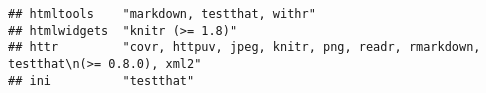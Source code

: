 \documentclass[]{book}
\begin{document}
\begin{verbatim}
## htmltools    "markdown, testthat, withr"                                                                                                                                                                                                                                                                                                                                                                                                                                                                                                                                                                                                                                                                               
## htmlwidgets  "knitr (>= 1.8)"                                                                                                                                                                                                                                                                                                                                                                                                                                                                                                                                                                                                                                                                                          
## httr         "covr, httpuv, jpeg, knitr, png, readr, rmarkdown, testthat\n(>= 0.8.0), xml2"                                                                                                                                                                                                                                                                                                                                                                                                                                                                                                                                                                                                                            
## ini          "testthat"                                                                                                                                                                                                                                                                                                                                                                                                                                                                                                                                                                                                                                                                                                

\end{verbatim}
\end{document}

